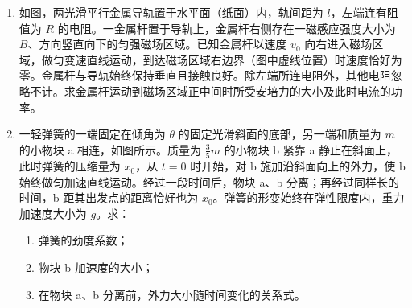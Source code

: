 \documentclass[\gkver]{gaokaozhenti}
\begin{document}
\begin{enumerate}
\item
如图，两光滑平行金属导轨置于水平面（纸面）内，轨间距为 $l$，左端连有阻值为 $R$ 的电阻。一金属杆置于导轨上，金属杆右侧存在一磁感应强度大小为 $B$、方向竖直向下的匀强磁场区域。已知金属杆以速度 $v_{0}$ 向右进入磁场区域，做匀变速直线运动，到达磁场区域右边界（图中虚线位置）时速度恰好为零。金属杆与导轨始终保持垂直且接触良好。除左端所连电阻外，其他电阻忽略不计。求金属杆运动到磁场区域正中间时所受安培力的大小及此时电流的功率。

\item
一轻弹簧的一端固定在倾角为 $\theta$ 的固定光滑斜面的底部，另一端和质量为 $m$ 的小物块 a 相连，如图所示。质量为 $\frac{3}{5}m$ 的小物块 b 紧靠 a 静止在斜面上，此时弹簧的压缩量为 $x_{0}$，从 $t=0$ 时开始，对 b 施加沿斜面向上的外力，使 b 始终做匀加速直线运动。经过一段时间后，物块 a、b 分离；再经过同样长的时间，b 距其出发点的距离恰好也为 $x_{0}$。弹簧的形变始终在弹性限度内，重力加速度大小为 $g$。求：
\begin{enumerate}
	\item
	弹簧的劲度系数；
	\item
	物块 b 加速度的大小；
	\item
	在物块 a、b 分离前，外力大小随时间变化的关系式。
\end{enumerate}
\end{enumerate}
\end{document}
